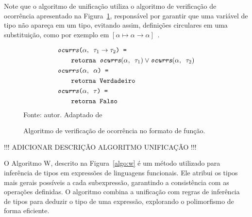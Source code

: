 Note que o algoritmo de unificação utiliza o algoritmo de verificação de
ocorrência apresentado na Figura~\ref{algo:occurs}, responsável por
garantir que uma variável de tipo não apareça em um tipo, evitando assim,
definições circulares em uma substituição, como por exemplo em
$[\alpha\mapsto\alpha\to\alpha]$~\cite{RIBEIRO2016}.

\begin{figure}[ht!]
  \caption{Algoritmo de verificação de ocorrência no formato de função.}
  \centering
  \begin{align*}
    & \texttt{\ensuremath{\textit{ocurrs}}($\alpha, \texttt{ } \tau_1 \to \tau_2$) = }   \\
    & \qquad{}\texttt{\ensuremath{\text{retorna}}\ensuremath{\texttt{ }}$\textit{ocurrs}(\alpha, \texttt{ } \tau_1) \lor \textit{ocurrs}(\alpha, \texttt{ }\tau_2)$}            \\
    & \texttt{\ensuremath{\textit{ocurrs}}($\alpha, \texttt{ } \alpha$) = }              \\
    & \qquad{}\texttt{\ensuremath{\text{retorna}}\ensuremath{\texttt{ }}\ensuremath{\texttt{Verdadeiro}}}     \\
    & \texttt{\ensuremath{\textit{ocurrs}}($\alpha, \texttt{ } \tau$) = }                \\
    & \qquad{}\texttt{\ensuremath{\text{retorna}}\ensuremath{\texttt{ }}\ensuremath{\texttt{Falso}}}
  \end{align*}
  \small{Fonte: autor. Adaptado de~\cite{RIBEIRO2016}}\label{algo:occurs}
\end{figure}

!!! ADICIONAR DESCRIÇÃO ALGORITMO UNIFICAÇÃO !!!

O Algoritmo W, descrito na Figura~\ref{algo:w} é um método utilizado para inferência de tipos em expressões de linguagens funcionais.
Ele atribui os tipos mais gerais possíveis a cada subexpressão, garantindo a consistência com as operações definidas.
O algoritmo combina a unificação com regras de inferência de tipos para deduzir o tipo de uma expressão, explorando o polimorfismo de forma eficiente.

